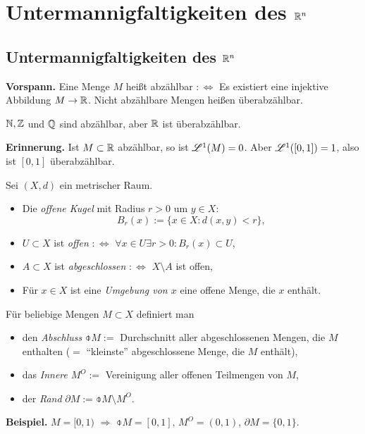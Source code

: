 \section{Untermannigfaltigkeiten des \texorpdfstring{$\mathbb{R}^n$}{IRn}}

\subsection{Untermannigfaltigkeiten des \texorpdfstring{$\mathbb{R}^n$}{IRn}}
\textbf{Vorspann.} Eine Menge $M$ heißt abzählbar $:\Leftrightarrow$ Es existiert eine injektive Abbildung $M \to \mathbb{R}$. Nicht abzählbare Mengen heißen überabzählbar.

\begin{exmp}
 $\mathbb{N}, \mathbb{Z}$ und $\mathbb{Q}$ sind abzählbar, aber $\mathbb{R}$ ist überabzählbar.
\end{exmp}

\textbf{Erinnerung.} Ist $M \subset \mathbb{R}$ abzählbar, so ist $\mathscr{L}^1(M) = 0$. Aber $\mathscr{L}^1( [0,1] ) = 1$, also ist $[0,1]$ überabzählbar.

Sei $(X,d)$ ein metrischer Raum. 
\begin{itemize}
 \item Die \emph{offene Kugel} mit Radius $r > 0$ um $y \in X$:
  \[ B_r(x) := \{ x \in X : d(x,y) < r \}, \]
 \item $U \subset X$ ist \emph{offen} $:\Leftrightarrow$ $\forall x \in U \exists r > 0 : B_r(x) \subset U$,
 \item $A \subset X$ ist \emph{abgeschlossen} $:\Leftrightarrow$ $X \setminus A$ ist offen,
 \item Für $x \in X$ ist eine \emph{Umgebung von $x$} eine offene Menge, die $x$ enthält.
\end{itemize}

Für beliebige Mengen $M \subset X$ definiert man 
\begin{itemize}
 \item den \emph{Abschluss} $\obar{M} :=$ Durchschnitt aller abgeschlossenen Mengen, die $M$ enthalten ($=$ ``kleinste'' abgeschlossene Menge, die $M$ enthält),
 \item das \emph{Innere} $M^O :=$ Vereinigung aller offenen Teilmengen von $M$, 
 \item der \emph{Rand} $\partial M := \obar{M} \setminus M^O$.
\end{itemize}
\textbf{Beispiel.} $M = [0,1)$ $\Rightarrow$ $\obar{M} = [0,1]$, $M^O = (0,1)$, $\partial M = \{ 0, 1 \}$.

